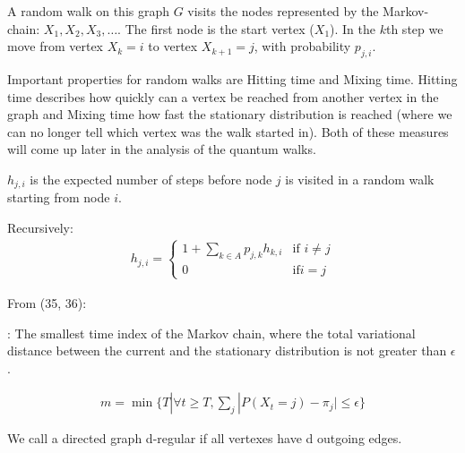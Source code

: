 A random walk on this graph $G$ visits the nodes represented by the Markov-chain: $X_1, X_2, X_3, \dots$. The first node is the start vertex ($X_1$). In the $k$th step we move from vertex $X_k=i$ to vertex $X_{k+1}=j$, with probability $p_{j,i}$.

Important properties for random walks are Hitting time and Mixing time. Hitting time describes how quickly can a vertex be reached from another vertex in the graph and Mixing time how fast the stationary distribution is reached (where we can no longer tell which vertex was the walk started in). Both of these measures will come up later in the analysis of the quantum walks.

 $h_{j,i}$ is the expected number of steps before node $j$ is visited in a random walk starting from node $i$.

Recursively:
\begin{align}
h_{j,i} = \left\{\begin{array}{lr}
1 + \sum\limits_{k\in{}A}p_{j,k}h_{k,i} & \text{if } i\neq{}j\\
0 & \text{if} i=j
\end{array}
\end{align}

From \cite{KempeIntroduction} (35, 36):

: The smallest time index of the Markov chain, where the total variational distance between the current and the stationary distribution is not greater than $\epsilon$.

\begin{align}
m = \min\{T | \forall{}t\geq{}T, \sum\limits_{j}|P(X_t = j) - \pi_j| \leq \epsilon\}
\end{align}


 We call a directed graph d-regular if all vertexes have d outgoing edges.
